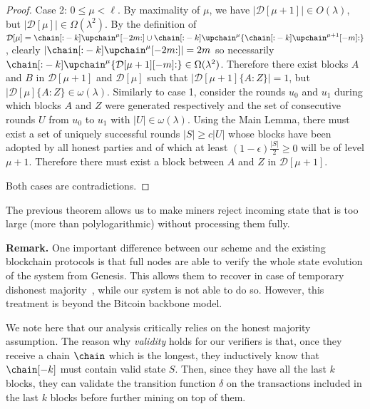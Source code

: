 \begin{proof}
	Case 2: $0 \leq \mu < \ell$. By maximality of $\mu$, we have
	$|\mathcal{D}[\mu + 1]| \in O(\lambda)$, but
	$|\mathcal{D}[\mu]| \in \Omega(\lambda^2)$.
	By the definition of
	$\mathcal{D}[\mu] = \chain[{:}-k]\upchain^\mu[-2m{:}] \cup
	\chain[{:}-k]\upchain^\mu\{\chain[{:}-k]\upchain^{\mu+1}[-m]{:}\}$, clearly
	$|\chain[{:}-k]\upchain^\mu[-2m{:}]| = 2m$ so necessarily
	$\chain[{:}-k]\upchain^\mu\{\mathcal{D}[\mu+1][-m]{:}\} \in \Omega(\lambda^2)$. Therefore there exist blocks $A$ and $B$
	in $\mathcal{D}[\mu+1]$ and $\mathcal{D}[\mu]$ such that
	$|\mathcal{D}[\mu + 1]\{A{:}Z\}| = 1$, but
	$|\mathcal{D}[\mu]\{A{:}Z\} \in \omega(\lambda)$. Similarly to case
	1, consider the rounds $u_0$ and $u_1$ during which blocks $A$ and $Z$ were
	generated respectively and the set of consecutive rounds $U$ from $u_0$ to
	$u_1$ with $|U| \in \omega(\lambda)$. Using the Main Lemma, there
	must exist a set of uniquely successful rounds $|S| \geq c|U|$ whose blocks
	have been adopted by all honest parties and of which at
	least $(1 - \epsilon)\frac{|S|}{2} \geq 0$ will be of level $\mu + 1$.
	Therefore there must exist a block between $A$ and $Z$ in
	$\mathcal{D}[\mu + 1]$.

	Both cases are contradictions.
\end{proof}

The previous theorem allows us to make miners reject incoming state that is too
large (more than polylogarithmic) without processing them fully.

\noindent
\textbf{Remark.} One important difference between our scheme and the existing
blockchain protocols is that full nodes are able to verify the whole state
evolution of the system from Genesis. This allows them to recover in case of
temporary dishonest majority~\cite{dishonest-majority}, while our system is
not able to do so. However, this treatment is beyond the Bitcoin backbone model.

We note here that our analysis critically relies on the honest majority
assumption. The reason why \emph{validity} holds for our verifiers is that, once
they receive a chain $\chain$ which is the longest, they inductively know that
$\chain[-k]$ must contain valid state $S$. Then, since they have all the last
$k$ blocks, they can validate the transition function $\delta$ on the
transactions included in the last $k$ blocks before further mining on top of
them.
